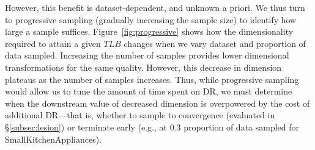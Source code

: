 However, this benefit is dataset-dependent, and unknown a priori.
We thus turn to progressive sampling (gradually increasing the sample size) to identify how large a sample suffices.
Figure~\ref{fig:progressive} shows how the dimensionality required to attain a given $TLB$ changes when we vary dataset and proportion of data sampled.
Increasing the number of samples provides lower dimensional transformations for the same quality.
However, this decrease in dimension plateaus as the number of samples increases.
Thus, while progressive sampling would allow us to tune the amount of time spent on DR, we must determine when the downstream value of decreased dimension is overpowered by the cost of additional DR---that is, whether to sample to convergence (evaluated in \S\ref{subsec:lesion}) or terminate early (e.g., at $0.3$ proportion of data sampled for SmallKitchenAppliances). 





